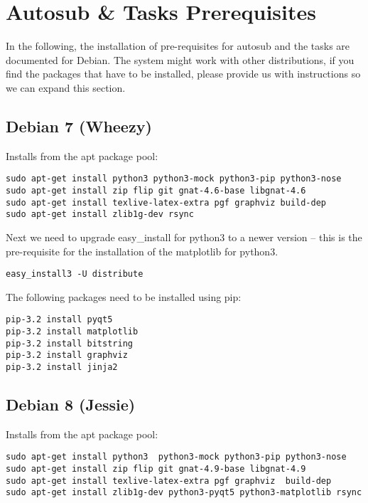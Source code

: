 \section{Autosub \& Tasks Prerequisites} \label{system_prerequisites}

In the following, the installation of pre-requisites for autosub and the tasks
are documented for Debian. The system might work with other distributions, if you
find the packages that have to be installed, please provide us with instructions
so we can expand this section.


\subsection{Debian 7 (Wheezy)}

Installs from the apt package pool:

\begin{verbatim}
sudo apt-get install python3 python3-mock python3-pip python3-nose
sudo apt-get install zip flip git gnat-4.6-base libgnat-4.6
sudo apt-get install texlive-latex-extra pgf graphviz build-dep
sudo apt-get install zlib1g-dev rsync
\end{verbatim}

Next we need to upgrade easy\_install for python3 to a newer version -- this
is the pre-requisite for the installation of the matplotlib for python3.

\begin{verbatim}
easy_install3 -U distribute
\end{verbatim}

The following packages need to be installed using pip:

\begin{verbatim}
pip-3.2 install pyqt5
pip-3.2 install matplotlib
pip-3.2 install bitstring
pip-3.2 install graphviz
pip-3.2 install jinja2
\end{verbatim}


\subsection{Debian 8 (Jessie)}

Installs from the apt package pool:

\begin{verbatim}
sudo apt-get install python3  python3-mock python3-pip python3-nose
sudo apt-get install zip flip git gnat-4.9-base libgnat-4.9
sudo apt-get install texlive-latex-extra pgf graphviz  build-dep
sudo apt-get install zlib1g-dev python3-pyqt5 python3-matplotlib rsync
\end{verbatim}

